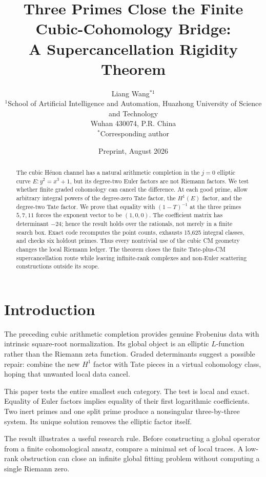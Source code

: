\documentclass[11pt]{article}
\title{Three Primes Close the Finite Cubic-Cohomology Bridge:\\
A Supercancellation Rigidity Theorem}
\author{Liang Wang$^{*1}$\\
\small $^{1}$School of Artificial Intelligence and Automation, Huazhong University of Science and Technology\\
\small Wuhan 430074, P.R. China\\
\small $^*$Corresponding author}
\date{Preprint, August 2026}
\theoremstyle{remark}\newtheorem{remark}[theorem]{Remark}
\begin{document}
\maketitle
\begin{abstract}
The cubic H\'enon channel has a natural arithmetic completion in the
\(j=0\) elliptic curve \(E:y^2=x^3+1\), but its degree-two Euler factors are
not Riemann factors.  We test whether finite graded cohomology can cancel the
difference.  At each good prime, allow arbitrary integral powers of the
degree-zero Tate factor, the \(H^1(E)\) factor, and the degree-two Tate factor.
We prove that equality with \((1-T)^{-1}\) at the three primes \(5,7,11\)
forces the exponent vector to be \((1,0,0)\).  The coefficient matrix has
determinant \(-24\); hence the result holds over the rationals, not merely in a
finite search box.  Exact code recomputes the point counts, exhausts 15,625
integral classes, and checks six holdout primes.  Thus every nontrivial use of
the cubic CM geometry changes the local Riemann ledger.  The theorem closes
the finite Tate-plus-CM supercancellation route while leaving infinite-rank
complexes and non-Euler scattering constructions outside its scope.
\end{abstract}

\section{Introduction}
The preceding cubic arithmetic completion provides genuine Frobenius data
with intrinsic square-root normalization.  Its global object is an elliptic
\(L\)-function rather than the Riemann zeta function.  Graded determinants
suggest a possible repair: combine the new \(H^1\) factor with Tate pieces in
a virtual cohomology class, hoping that unwanted local data cancel.

This paper tests the entire smallest such category.  The test is local and
exact.  Equality of Euler factors implies equality of their first
logarithmic coefficients.  Two inert primes and one split prime produce a
nonsingular three-by-three system.  Its unique solution removes the elliptic
factor itself.

The result illustrates a useful research rule.  Before constructing a global
operator from a finite cohomological ansatz, compare a minimal set of local
traces.  A low-rank obstruction can close an infinite global fitting problem
without computing a single Riemann zero.
\end{document}
